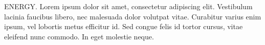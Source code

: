 ENERGY. Lorem ipsum dolor sit amet, consectetur adipiscing elit. Vestibulum lacinia faucibus libero, nec malesuada dolor volutpat vitae. Curabitur varius enim ipsum, vel lobortis metus efficitur id. Sed congue felis id tortor cursus, vitae eleifend nunc commodo. In eget molestie neque.
